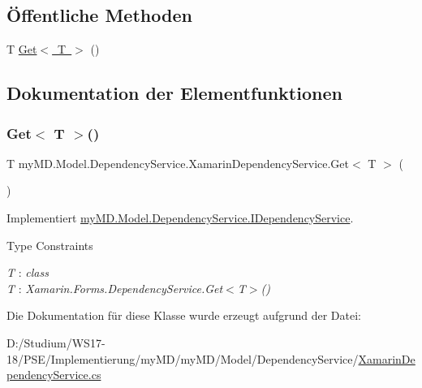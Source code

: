 \subsection*{Öffentliche Methoden}
\begin{DoxyCompactItemize}
\item 
T \mbox{\hyperlink{classmy_m_d_1_1_model_1_1_dependency_service_1_1_xamarin_dependency_service_a45858cd78923d949421471c9cc4d30be}{Get$<$ T $>$}} ()
\end{DoxyCompactItemize}


\subsection{Dokumentation der Elementfunktionen}
\mbox{\label{classmy_m_d_1_1_model_1_1_dependency_service_1_1_xamarin_dependency_service_a45858cd78923d949421471c9cc4d30be}} 
\subsubsection{\texorpdfstring{Get$<$ T $>$()}{Get< T >()}}
{\footnotesize\ttfamily T my\+M\+D.\+Model.\+Dependency\+Service.\+Xamarin\+Dependency\+Service.\+Get$<$ T $>$ (\begin{DoxyParamCaption}{ }\end{DoxyParamCaption})}



Implementiert \mbox{\hyperlink{interfacemy_m_d_1_1_model_1_1_dependency_service_1_1_i_dependency_service_a2e088bfff9d0695a3a761faeeaba481e}{my\+M\+D.\+Model.\+Dependency\+Service.\+I\+Dependency\+Service}}.

\begin{Desc}
\item[Type Constraints]\begin{description}
\item[{\em T} : {\em class}]\item[{\em T} : {\em Xamarin.\+Forms.\+Dependency\+Service.\+Get$<$T$>$()}]\end{description}
\end{Desc}


Die Dokumentation für diese Klasse wurde erzeugt aufgrund der Datei\+:\begin{DoxyCompactItemize}
\item 
D\+:/\+Studium/\+W\+S17-\/18/\+P\+S\+E/\+Implementierung/my\+M\+D/my\+M\+D/\+Model/\+Dependency\+Service/\mbox{\hyperlink{_xamarin_dependency_service_8cs}{Xamarin\+Dependency\+Service.\+cs}}\end{DoxyCompactItemize}
